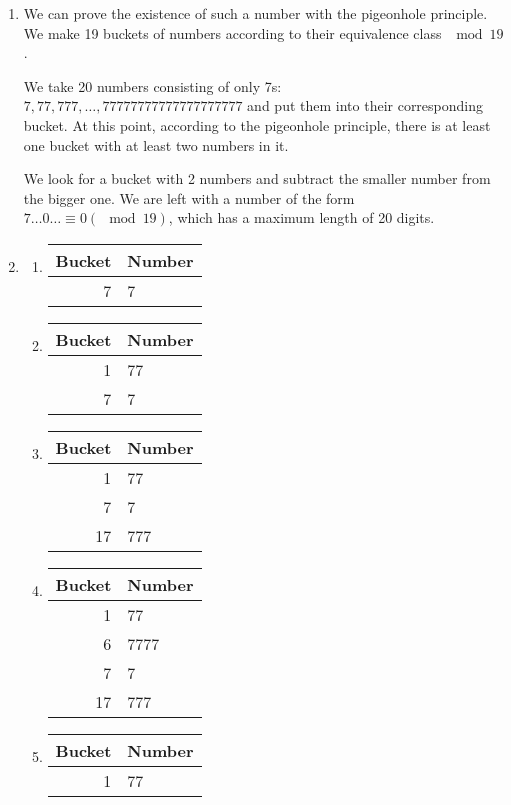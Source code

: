 \documentclass[12pt]{article}
\begin{document}
\begin{enumerate}[a]
	\item %
	We can prove the existence of such a number with the pigeonhole principle. We make 19 buckets of numbers according to their equivalence class $\mod 19$.

	We take 20 numbers consisting of only 7s: $7, 77, 777, \dots, 77777777777777777777$ and put them into their corresponding bucket. At this point, according to the pigeonhole principle, there is at least one bucket with at least two numbers in it.

	We look for a bucket with 2 numbers and subtract the smaller number from the bigger one. We are left with a number of the form $7 \dots 0 \dots \equiv 0 (\mod 19)$, which has a maximum length of 20 digits.

	\item %
	\begin{multicols}{2}
	\begin{enumerate}[1]
		\item
		\begin{tabular}{r|l}
			Bucket & Number\\\hline\hline
			7 & 7
		\end{tabular}
		\item
		\begin{tabular}{r|l}
			Bucket & Number\\\hline\hline
			1 & 77\\\hline
			7 & 7
		\end{tabular}
		\item
		\begin{tabular}{r|l}
			Bucket & Number\\\hline\hline
			1 & 77\\\hline
			7 & 7\\\hline
			17 & 777
		\end{tabular}
		\item
		\begin{tabular}{r|l}
			Bucket & Number\\\hline\hline
			1 & 77\\\hline
			6 & 7777\\\hline
			7 & 7\\\hline
			17 & 777
		\end{tabular}
		\item
		\begin{tabular}{r|l}
			Bucket & Number\\\hline\hline
			1 & 77\\\hline

\end{tabular}
\end{enumerate}
\end{multicols}
\end{enumerate}
\end{document}
